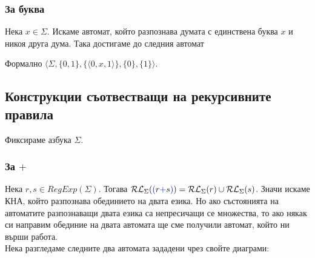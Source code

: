 \documentclass[12pt]{article}
\begin{document}
\subsubsection{За буква}
Нека \(x \in \Sigma\).
Искаме автомат, който разпознава думата с единствена буква \(x\) и никоя друга дума.
Така достигаме до следния автомат
\begin{center}
\end{center}
Формално \(\langle \Sigma, \{0, 1\}, \{\langle 0, x, 1 \rangle\}, \{0\}, \{1\} \rangle\).

\subsection{Конструкции съотвестващи на рекурсивните правила}
Фиксираме азбука \(\Sigma\).

\subsubsection{За \(+\)}
Нека \(r, s \in RegExp(\Sigma)\). Тогава \(\mathcal{RL}_\Sigma(\textcolor{blue}{(}r \textcolor{blue}{+} s \textcolor{blue}{)}) = \mathcal{RL}_\Sigma(r) \cup \mathcal{RL}_\Sigma(s)\).
Значи искаме КНА, който разпознава обединието на двата езика.
Но ако състоянията на автоматите разпознаващи двата езика са непресичащи се множества,
то ако някак си направим обединие на двата автомата ще сме получили автомат, който ни върши работа. \\

Нека разгледаме следните два автомата зададени чрез свойте диаграми:
\end{document}
